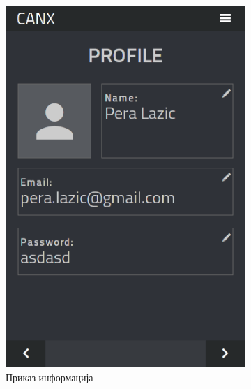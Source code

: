 \documentclass[a4paper]{article}
\begin{document}
\begin{figure}
\centering
\begin{subfigure}{.5\textwidth}
  \centering
  \includegraphics[width=.9\linewidth]{profile}
  \caption{Приказ информација}
  \label{fig:sub1}
\end{subfigure}%
\begin{subfigure}{.5\textwidth}
  \centering

\end{subfigure}
\end{figure}
\end{document}
